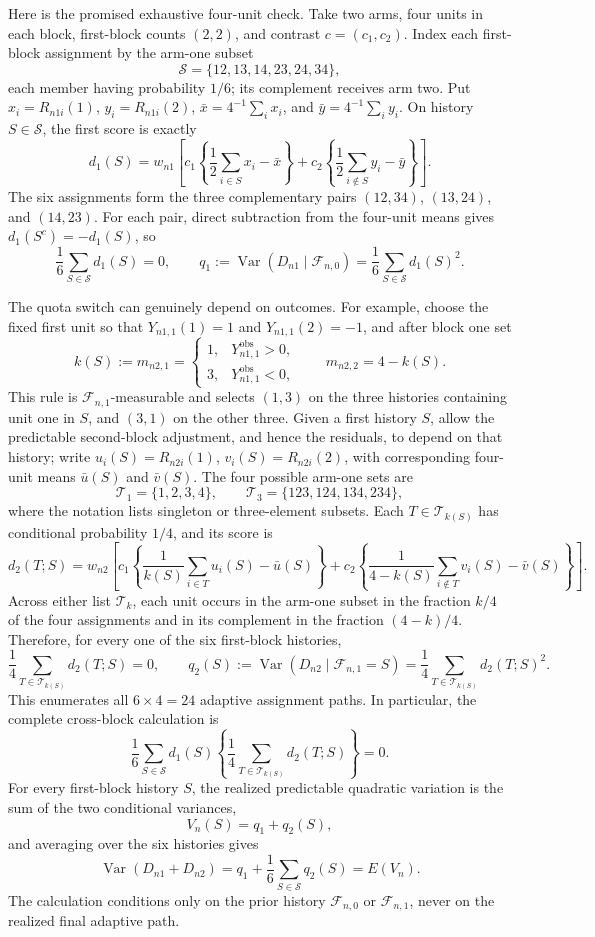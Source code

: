 Here is the promised exhaustive four-unit check.  Take two arms, four units in each block, first-block counts \((2,2)\), and contrast \(c=(c_1,c_2)\).  Index each first-block assignment by the arm-one subset
\[
 \mathcal S=\{12,13,14,23,24,34\},
\]
each member having probability \(1/6\); its complement receives arm two.  Put \(x_i=R_{n1i}(1)\), \(y_i=R_{n1i}(2)\), \(\bar x=4^{-1}\sum_i x_i\), and \(\bar y=4^{-1}\sum_i y_i\).  On history \(S\in\mathcal S\), the first score is exactly
\[
 d_1(S)=w_{n1}\left[
 c_1\left\{\frac12\sum_{i\in S}x_i-\bar x\right\}
 +c_2\left\{\frac12\sum_{i\notin S}y_i-\bar y\right\}
 \right].
\]
The six assignments form the three complementary pairs \((12,34)\), \((13,24)\), and \((14,23)\).  For each pair, direct subtraction from the four-unit means gives \(d_1(S^c)=-d_1(S)\), so
\[
 \frac16\sum_{S\in\mathcal S}d_1(S)=0,
 \qquad
 q_1:=\operatorname{Var}(D_{n1}\mid\mathcal F_{n,0})
 =\frac16\sum_{S\in\mathcal S}d_1(S)^2.
\]

The quota switch can genuinely depend on outcomes.  For example, choose the fixed first unit so that \(Y_{n1,1}(1)=1\) and \(Y_{n1,1}(2)=-1\), and after block one set
\[
 k(S):=m_{n2,1}
 =\begin{cases}
 1,&Y_{n1,1}^{\mathrm{obs}}>0,\\
 3,&Y_{n1,1}^{\mathrm{obs}}<0,
 \end{cases}
 \qquad m_{n2,2}=4-k(S).
\]
This rule is \(\mathcal F_{n,1}\)-measurable and selects \((1,3)\) on the three histories containing unit one in \(S\), and \((3,1)\) on the other three.  Given a first history \(S\), allow the predictable second-block adjustment, and hence the residuals, to depend on that history; write \(u_i(S)=R_{n2i}(1)\), \(v_i(S)=R_{n2i}(2)\), with corresponding four-unit means \(\bar u(S)\) and \(\bar v(S)\).  The four possible arm-one sets are
\[
 \mathcal T_1=\{1,2,3,4\},
 \qquad
 \mathcal T_3=\{123,124,134,234\},
\]
where the notation lists singleton or three-element subsets.  Each \(T\in\mathcal T_{k(S)}\) has conditional probability \(1/4\), and its score is
\[
 d_2(T;S)=w_{n2}\left[
 c_1\left\{\frac1{k(S)}\sum_{i\in T}u_i(S)-\bar u(S)\right\}
 +c_2\left\{\frac1{4-k(S)}\sum_{i\notin T}v_i(S)-\bar v(S)\right\}
 \right].
\]
Across either list \(\mathcal T_k\), each unit occurs in the arm-one subset in the fraction \(k/4\) of the four assignments and in its complement in the fraction \((4-k)/4\).  Therefore, for every one of the six first-block histories,
\[
 \frac14\sum_{T\in\mathcal T_{k(S)}}d_2(T;S)=0,
 \qquad
 q_2(S):=\operatorname{Var}(D_{n2}\mid\mathcal F_{n,1}=S)
 =\frac14\sum_{T\in\mathcal T_{k(S)}}d_2(T;S)^2.
\]
This enumerates all \(6\times4=24\) adaptive assignment paths.  In particular, the complete cross-block calculation is
\[
 \frac16\sum_{S\in\mathcal S}d_1(S)
 \left\{\frac14\sum_{T\in\mathcal T_{k(S)}}d_2(T;S)\right\}=0.
\]
For every first-block history \(S\), the realized predictable quadratic variation is the sum of the two conditional variances,
\[
 V_n(S)=q_1+q_2(S),
\]
and averaging over the six histories gives
\[
 \operatorname{Var}(D_{n1}+D_{n2})
 =q_1+\frac16\sum_{S\in\mathcal S}q_2(S)=E(V_n).
\]
The calculation conditions only on the prior history \(\mathcal F_{n,0}\) or \(\mathcal F_{n,1}\), never on the realized final adaptive path.